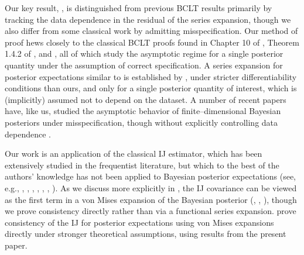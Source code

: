 Our key result, , is distinguished from previous BCLT
results primarily by tracking the data dependence in the residual of the series
expansion, though we also differ from some classical work by admitting
misspecification.  Our method of proof hews closely to the classical BCLT proofs
found in  Chapter 10 of \citet{van:2000:asymptotic}, Theorem 1.4.2 of
\citet{ghosh:2003:bayesian}, and \citet{lehman:1983:pointestimation}, all of
which study the asymptotic regime for a single posterior quantity under the
assumption of correct specification.  A series expansion for posterior
expectations similar to  is established by
\citet{kass:1990:posteriorexpansions}, under stricter differentiability
conditions than ours, and only for a single posterior quantity of interest,
which is (implicitly) assumed not to depend on the dataset. A number of recent
papers have, like us, studied the asymptotic behavior of finite--dimensional
Bayesian posteriors under misspecification, though without explicitly
controlling data dependence
\citep{kleijn:2012:bvm,miller:2021:bclt,kasprzak:2022:laplace}.

Our work is an application of the classical IJ estimator, which has been
extensively studied in the frequentist literature, but which to the best of the
authors' knowledge has not been applied to Bayesian posterior expectations (see,
e.g., \citet{jaeckel:1972:infinitesimal}, \citet{efron:1982:jackknife},
\citet{shao:2012:jackknife}, \citet{efron:2014:estimation},
\citet{wager:2014:confidence},
\citet{peng:2021:biasconsistencyalternativeperspectives},
\citet{ghosal:2022:infinitesimaljackknifecombinationsmodels}).
As we discuss more explicitly in , the IJ covariance can be
viewed as the first term in a von Mises expansion of the Bayesian posterior
(\citet{mises:1947:asymptotic}, \citet{reeds:1976:thesis},
\citet{serfling:1980:approximation}), though we prove consistency directly
rather than via a functional series expansion.
 prove consistency of the IJ for posterior
expectations using von Mises expansions directly under stronger theoretical
assumptions, using results from the present paper.

